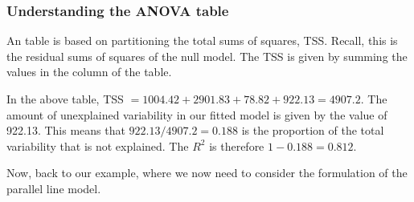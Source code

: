 \documentclass{beamer}\usepackage[]{graphicx}\usepackage[]{xcolor}
\begin{document}
\begin{frame}[fragile]
\frametitle{Understanding the ANOVA table}

An  table is  based on partitioning the total sums of squares, TSS. Recall, this is the residual sums of squares of the null model. The TSS is given by summing the values in the  column of the table.
\bigskip

In the above table, TSS $=1004.42+2901.83+78.82+922.13=4907.2$. The amount of unexplained variability in our fitted model is given by the  value of 922.13. This means that $922.13/4907.2=0.188$ is the proportion of the total variability that is not explained. The $R^2$ is therefore $1-0.188=0.812$.
\bigskip \bigskip

Now, back to our example, where we now need to consider the formulation of the parallel line model.
\end{frame}
\end{document}
